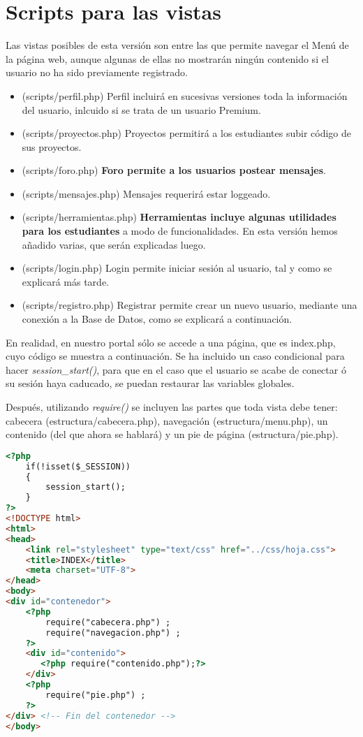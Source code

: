 \documentclass[12pt]{report}
\begin{document}
\section{Scripts para las vistas}
Las vistas posibles de esta versión son entre las que permite navegar el Menú de la página web, aunque algunas de ellas no mostrarán ningún contenido si el usuario no ha sido previamente registrado.
\begin{itemize}
    \item (scripts/perfil.php) Perfil incluirá en sucesivas versiones toda la información del usuario, inlcuido si se trata de un usuario Premium.
    \item (scripts/proyectos.php) Proyectos permitirá a los estudiantes subir código de sus proyectos.
    \item (scripts/foro.php) \textbf{Foro permite a los usuarios postear mensajes}.
    \item (scripts/mensajes.php) Mensajes requerirá estar loggeado.
    \item (scripts/herramientas.php) \textbf{Herramientas incluye algunas utilidades para los estudiantes} a modo de funcionalidades. En esta versión hemos añadido varias, que serán explicadas luego.
    \item (scripts/login.php) Login permite iniciar sesión al usuario, tal y como se explicará más tarde. 
    \item (scripts/registro.php) Registrar permite crear un nuevo usuario, mediante una conexión a la Base de Datos, como se explicará a continuación.
\end{itemize}

En realidad, en nuestro portal sólo se accede a una página, que es index.php, cuyo código se muestra a continuación. Se ha incluido un caso condicional para hacer \textit{session\_start()}, para que en el caso que el usuario se acabe de conectar ó su sesión haya caducado, se puedan restaurar las variables globales.

Después, utilizando \textit{require()} se incluyen las partes que toda vista debe tener: cabecera (estructura/cabecera.php), navegación (estructura/menu.php), un contenido (del que ahora se hablará) y  un pie de página (estructura/pie.php).
\newline
\begin{lstlisting}[language=HTML]
<?php
    if(!isset($_SESSION)) 
    { 
        session_start(); 
    } 
?>
<!DOCTYPE html>
<html>
<head>
    <link rel="stylesheet" type="text/css" href="../css/hoja.css">
    <title>INDEX</title>
    <meta charset="UTF-8">
</head>
<body>
<div id="contenedor">
    <?php 
        require("cabecera.php") ;
	 	require("navegacion.php") ;
	?>
	<div id="contenido">
	   <?php require("contenido.php");?>
	</div>
	<?php 
	 	require("pie.php") ;
	?>
</div> <!-- Fin del contenedor -->
</body>
\end{lstlisting}
\end{document}

